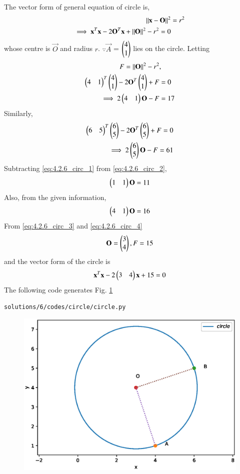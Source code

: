 The vector form of general equation of circle is, 
\begin{align} 
\left\lVert\mathbf{x}- \mathbf{O}\right\rVert^2 &= r^2
\\
\implies 
\mathbf{x}^T\mathbf{x}-2\mathbf{O}^T\mathbf{x}+\left\lVert\mathbf{O}\right\rVert^2-r^2=0 
\label{eq:4.2.6_circ}
\end{align}
whose centre is $\vec{O}$ and radius $r$.
$\because \vec{A}$ = $\begin{pmatrix}4\\1\end{pmatrix}$ lies on the circle. 
Letting 
\begin{align} 
F=\left\lVert\mathbf{O}\right\rVert^2-r^2&,
\\
\begin{pmatrix}4 & 1\end{pmatrix}^T\begin{pmatrix}4\\1\end{pmatrix}-2\mathbf{O}^T\begin{pmatrix}4\\1\end{pmatrix}+F&=0
\\
\implies 2\begin{pmatrix}4&1\end{pmatrix}\mathbf{O} - F &= 17 \label{eq:4.2.6_circ_1}
\end{align}
Similarly, 
\begin{align}
\begin{pmatrix}6 & 5\end{pmatrix}^T\begin{pmatrix}6\\5\end{pmatrix}-2\mathbf{O}^T\begin{pmatrix}6\\5\end{pmatrix}+F=0
\\
\implies 2\begin{pmatrix}6\\5\end{pmatrix}\mathbf{O} - F = 61 \label{eq:4.2.6_circ_2}
\end{align}
Subtracting  \ref{eq:4.2.6_circ_1} from \ref{eq:4.2.6_circ_2},
\begin{align} 
\begin{pmatrix}1&1\end{pmatrix}\mathbf{O}=11 \label{eq:4.2.6_circ_4}
\end{align}
Also, from the given information, 
\begin{align} 
\begin{pmatrix}4&1\end{pmatrix}\mathbf{O}=16 \label{eq:4.2.6_circ_3}
\end{align}
From \ref{eq:4.2.6_circ_3} and \ref{eq:4.2.6_circ_4}
\begin{align} 
 \mathbf{O} = \begin{pmatrix}3\\4\end{pmatrix}, F = 15
\end{align}
and the vector form of the circle is 
\begin{align}
\mathbf{x}^T\mathbf{x}-2\begin{pmatrix}3&4\end{pmatrix}\mathbf{x}+15=0
\end{align}
The following code generates Fig. \ref{fig:4.2.6_circ_1}

\begin{lstlisting}
solutions/6/codes/circle/circle.py
\end{lstlisting}

\begin{figure}[!ht]
\centering
\includegraphics[width=\columnwidth]{./solutions/6/codes/circle/circle.eps}
\caption{}
\label{fig:4.2.6_circ_1}
\end{figure}

